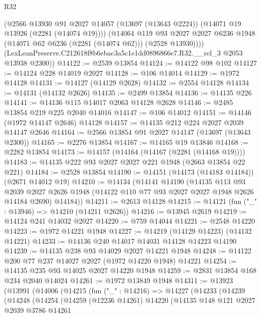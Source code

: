 \begin{lexlean}{R32}
\begin{coremodule}
          (@2566
            @13930
            @91
            @2027
            @14057
            (@13697 (@13643 @2224))
            (@14071 @19 @13926 (@2281 (@14074 @19))))
          (@14064
            @119
            @93
            @2027
            @2027
            @6236
            @1948
            (@14071 @62 @6236 (@2281 (@14074 @62)))
            (@2528 @13930))))
      (LexLeanPreserve.C212618f8b6ebac3a5c1e1dd0896866e7.R32.__rel_3 @2053 @13938 @2300))
@14122 := @2539 @13854
@14124 := @14122 @98 @102
@14127 := @14124 @228 @14019 @2027
@14128 := @106 @14014
@14129 := @1972 @14128
@14131 := @14127 (@14129 @2628)
@14132 := @2554 @14128
@14134 := @14131 (@14132 @2626)
@14135 := @2499 @13854
@14136 := @14135 @226
@14141 := @14136 @115 @14017 @2063 @14128 @2628
@14146 := @2485 @13854 @219 @225 @2040 @14016
@14147 := @106 @14012
@14151 := @14146 (@1972 @14147 @2646) @14128
@14157 := @14135 @212 @224 @2027 @2039 @14147 @2646
@14164 := @2566 @13854 @91 @2027 @14147 (@13697 (@13643 @2300))
@14165 := @2276 @13854
@14167 := @14165 @19 @13846
@14168 := @2282 @13854
@14173 := @14157 (@14164 (@14167 (@2281 (@14168 @19))))
@14183 := @14135 @222 @93 @2027 @2027 @221 @1948 (@2663 @13854 @22 @221)
@14184 := @2528 @13854
@14190 := @14151 (@14173 (@14183 @14184)) (@2671 @14012 @19)
@14210 := @14134
    (@14141
      @14190
      (@14135
        @113
        @93
        @2039
        @2027
        @2626
        @1948
        (@14122 @110 @77 @93 @2027 @2027 @1948 @2626 @14184 @2690)
        @14184))
@14211 := @2613 @14128
@14215 := @14121 (fun ("_" : @13946) => @14210 (@14211 @2626))
@14216 := @13945 @2619
@14219 := @14124 @241 @14032 @2027
@14220 := @759 @14044
@14221 := @2548 @14220
@14223 := @1972 @14221 @1948
@14227 := @14219 (@14129 @14223) (@14132 @14221)
@14233 := @14136 @240 @14017 @14031 @14128 @14223 @14190
@14239 := @14135 @238 @93 @14029 @2027 @14221 @1948
@14248 := @14122 @200 @77 @237 @14027 @2027 (@1972 @14220 @1948) @14221
@14254 := @14135 @235 @93 @14025 @2027 @14220 @1948
@14259 := @2831 @13854 @168 @234 @2040 @14024
@14261 := @1972 @13849 @1948
@14311 := @13923
    (@13991
      (@14006
        (@14215
          (fun ("_" : @14216) =>
          @14227
            (@14233
              (@14239
                (@14248
                  (@14254
                    (@14259
                      (@12236 @14261)
                      @14220
                      (@14135
                        @148
                        @121
                        @2027
                        @2039
                        @3786
                        @14261

\end{coremodule}
\end{lexlean}
